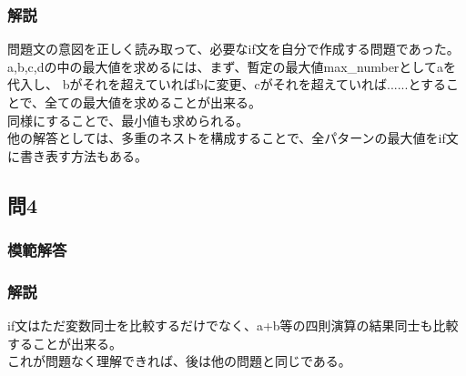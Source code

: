 \documentclass[a4j,titlepage,dvipdfmx]{jsarticle}   %
\newcommand{\codepath}{./code/02_Answer}
\begin{document}
\subsubsection{解説}
問題文の意図を正しく読み取って、必要なif文を自分で作成する問題であった。\\
a,b,c,dの中の最大値を求めるには、まず、暫定の最大値max_numberとしてaを代入し、
bがそれを超えていればbに変更、cがそれを超えていれば......とすることで、全ての最大値を求めることが出来る。\\
同様にすることで、最小値も求められる。\\
他の解答としては、多重のネストを構成することで、全パターンの最大値をif文に書き表す方法もある。\\
\subsection{問4}
\subsubsection{模範解答}

\subsubsection{解説}
if文はただ変数同士を比較するだけでなく、a+b等の四則演算の結果同士も比較することが出来る。\\
これが問題なく理解できれば、後は他の問題と同じである。\\
\end{document}
